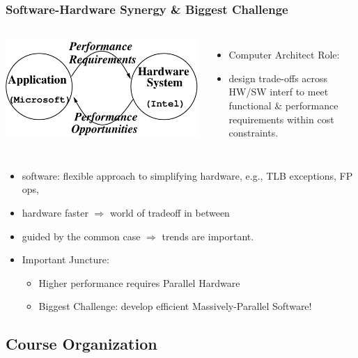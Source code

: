 \documentclass{beamer}
\renewcommand{\emph}[1]{\textcolor{structure}{#1}}
\newcommand{\emp}[1]{\textcolor{DikuRed}{ #1}}
\begin{document}
\begin{frame}[fragile,t]
\frametitle{Software-Hardware Synergy \& Biggest Challenge}
\medskip
\begin{columns}
\includegraphics[width=29ex]{Figures/L1/Synergy}
\vspace{-3ex}
\begin{itemize}
    \item Computer Architect Role:
    \item \emp{design trade-offs across HW/SW interf to meet functional 
            \& performance requirements within cost constraints.}
\end{itemize}
\end{columns}
\medskip

\begin{itemize}
    \item software: flexible approach to simplifying hardware, 
            e.g., TLB exceptions, FP ops,
    \item hardware faster $\Rightarrow$ world of tradeoff in between 
    \item guided by the common case $\Rightarrow$ trends are important.\bigskip

    \item \emp{Important Juncture:} 
        \begin{itemize}
            \item \emph{Higher performance requires Parallel Hardware}
            \item \alert{Biggest Challenge: 
                    develop efficient Massively-Parallel Software!}
        \end  {itemize}
\end{itemize}
\end{frame}

\subsection{Course Organization}

\end{document}
